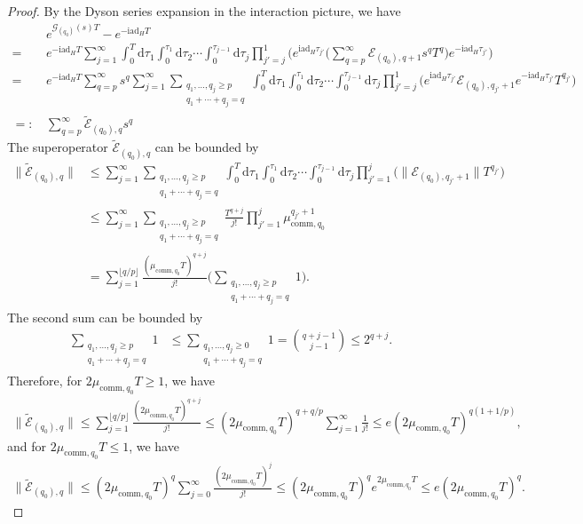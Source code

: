 \documentclass[aps,pra,reprint,groupedaddress,floatfix]{revtex4-2}
\renewcommand{\i}{\mathrm{i}}
\renewcommand{\d}{\mathrm{d}}
\newcommand{\ad}{\mathrm{ad}}
\newcommand{\G}{\mathcal{G}}
\newcommand{\E}{\mathcal{E}}
\begin{document}
\begin{proof}
By the Dyson series expansion in the interaction picture, we have 
\begin{align*}
    &e^{\G_{(q_0)}(s) T}-e^{-\i \ad_H T} \\
    = \ & e^{-\i \ad_H T}  \sum_{j=1}^{\infty} \int_{0}^T \d \tau_1 \int_{0}^{\tau_1}\d \tau_2 \cdots \int_{0}^{\tau_{j-1}}\d \tau_j \prod_{j'=j}^{1}\bigg(e^{\i\ad_H \tau_{j'}}\bigg(\sum_{q=p}^{\infty}\E_{(q_0),q+1}s^qT^q\bigg)e^{-\i \ad_H \tau_{j'}}\bigg) \\
    = \ &  e^{-\i \ad_H T}\sum_{q=p}^{\infty}s^{q} \sum_{j=1}^{\infty} \sum_{\substack{q_1,\ldots,q_j \ge p \\ q_1+\cdots+q_j=q}} \int_{0}^T \d \tau_1 \int_{0}^{\tau_1}\d \tau_2 \cdots \int_{0}^{\tau_{j-1}}\d \tau_j \prod_{j'=j}^{1}\bigg(e^{\i\ad_H \tau_{j'}}\E_{(q_0),q_{j'}+1}e^{-\i \ad_H \tau_{j'}}T^{q_{j'}}\bigg)\\
    =:\,& \sum_{q=p}^{\infty}\tilde{\E}_{(q_0),q} s^q   
\end{align*}
The superoperator $\tilde{\E}_{(q_0),q}$ can be bounded by \begin{align*}
    \big\|\tilde{\E}_{(q_0),q}\big\|&\le \sum_{j=1}^{\infty} \sum_{\substack{q_1,\ldots,q_j \ge p \\ q_1+\cdots+q_j=q}} \int_{0}^T \d \tau_1 \int_{0}^{\tau_1}\d \tau_2 \cdots \int_{0}^{\tau_{j-1}}\d \tau_j \prod_{j'=1}^{j}\big(\big\|\E_{(q_0),q_{j'}+1}\big\|T^{q_{j'}}\big) \\
    &\le  \sum_{j=1}^{\infty} \sum_{\substack{q_1,\ldots,q_j \ge p \\ q_1+\cdots+q_j=q}}\frac{T^{q+j}}{j!}\prod_{j'=1}^{j}\mu_{\mathrm{comm},q_0}^{q_{j'}+1} \\
    &=\sum_{j=1}^{\lfloor q/p\rfloor }\frac{(\mu_{\mathrm{comm},q_0}T)^{q+j}}{j!}\Big(\sum_{\substack{q_1,\ldots,q_j \ge p \\ q_1+\cdots+q_j=q}} 1\Big).
\end{align*}
The second sum can be bounded by \begin{align*}
    \sum_{\substack{q_1,\ldots,q_j \ge p \\ q_1+\cdots+q_j=q}} 1 &\le \sum_{\substack{ q_1,\ldots,q_j \ge 0 \\ q_1+\cdots+q_j=q}} 1=\binom{q+j-1}{j-1} \le 2^{q+j}.
\end{align*}
Therefore, for $2\mu_{\mathrm{comm},q_0}T\ge 1$, we have \begin{align*}
    \big\|\tilde{\E}_{(q_0),q}\big\|\le \sum_{j=1}^{\lfloor q/p\rfloor }\frac{(2\mu_{\mathrm{comm},q_0}T)^{q+j}}{j!} 
    \le (2\mu_{\mathrm{comm},q_0}T)^{q+q/p}\sum_{j=1}^{\infty}\frac{1}{j!}\le e(2\mu_{\mathrm{comm},q_0}T)^{q(1+1/p)} ,
\end{align*}
and for $2\mu_{\mathrm{comm},q_0}T\le 1$, we have \begin{align*}
    \big\|\tilde{\E}_{(q_0),q}\big\| \le (2\mu_{\mathrm{comm},q_0}T)^{q}\sum_{j=0}^{\infty}\frac{ (2\mu_{\mathrm{comm},q_0}T)^{j}}{j!}\le (2\mu_{\mathrm{comm},q_0}T)^{q} e^{2\mu_{\mathrm{comm},q_0}T}\le e(2\mu_{\mathrm{comm},q_0}T)^{q}.
\end{align*}
\end{proof}
\end{document}

